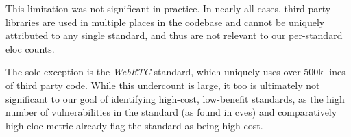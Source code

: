 This limitation was not significant in practice.  In nearly all
cases, third party libraries are used in multiple places in the \FF codebase
and cannot be uniquely attributed to any single standard, and thus are not
relevant to our per-standard \gls{eloc} counts.

The sole exception is the \textit{WebRTC} standard, which uniquely uses over
500k lines of third party code.  While this undercount is large, it too is
ultimately not significant to our goal of identifying high-cost, low-benefit
standards, as the high number of vulnerabilities in the standard  (as found in
\gls{cve}s) and comparatively high \gls{eloc} metric already flag the standard
as being high-cost.
